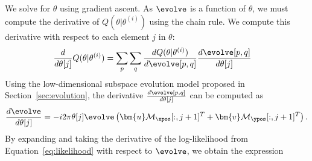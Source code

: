 We solve for $\theta$ using gradient ascent. As $\evolve$ is a function of $\theta$, we must %
compute the derivative of $Q(\theta|\theta^{(i)})$ using the chain rule. We compute this derivative with respect to each element $j$ in $\theta$: 
\begin{align}
\frac{d}{d \theta[j] } Q(\theta|\theta^{(i)} ) &=  \sum_p \sum_q  \frac{d Q(\theta|\theta^{(i)} )  }{d \evolve[p,q]} \frac{d \evolve[p,q]}{d \theta[j] } 
\end{align}
Using the low-dimensional subspace evolution model proposed in Section~\ref{sec:evolution}, the derivative $\frac{d \evolve[p,q]}{d \theta[j] }$ can be computed as 
\begin{align}
\frac{d \evolve }{d \theta[j]} = -i 2 \pi \theta[j] \evolve  \left( \bm{u} \mathcal{M}_{\xpos}[:,j+1]^T  + \bm{v} \mathcal{M}_{\ypos}[:,j+1]^T  \right).
\end{align}
By expanding and taking the derivative of the log-likelihood from Equation~\ref{eq:likelihood} with respect to $\evolve$, we obtain the expression 
